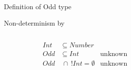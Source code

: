 \newsavebox\oddbox
\begin{lrbox}{\oddbox}
  \begin{minipage}{11cm}
    
  \end{minipage}
\end{lrbox}

\begin{frame}{Definition of Odd type}
  \usebox\oddbox
\end{frame}



\begin{frame}{Non-determinism by }
  \begin{columns}[T]
    \begin{column}{0.35\textwidth}
      \centering
      
      \begin{align*}
        Int&\subseteq Number\\
        Odd&\subseteq Int &\text{unknown}\\
        Odd&~\cap~ !Int = \emptyset &\text{unknown}
      \end{align*}
      \scalebox{0.9}{}%
    \end{column}%
    \begin{column}{0.7\textwidth}
    \end{column}
  \end{columns}
\end{frame}








\newsavebox\classbox
\begin{lrbox}{\classbox}
  \begin{minipage}{5cm}
    
  \end{minipage}
\end{lrbox}

